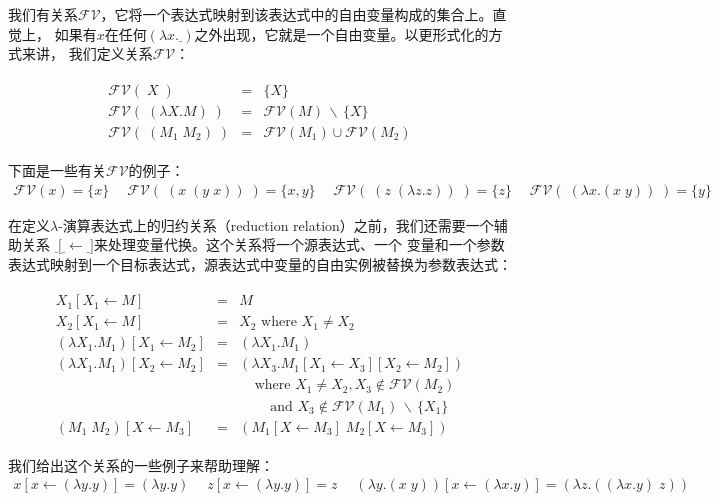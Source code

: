\documentclass[12pt]{article}
\begin{document}
\indent{}我们有关系$\mathcal{FV}$，它将一个表达式映射到该表达式中的自由变量构成的集合上。直觉上，
如果有$x$在任何$(\lambda x.\underline{~})$之外出现，它就是一个自由变量。以更形式化的方式来讲，
我们定义关系$\mathcal{FV}$：
\begin{tcolorbox}[top=-0.8em,left=0mm,right=0mm]
\begin{gather*}
\begin{array}{lcl}
\mathcal{FV}(\;X\;)             & = & \{X\}\\
\mathcal{FV}(\;(\lambda X.M)\;) & = & \mathcal{FV}(M) \,\backslash\, \{X\}\\
\mathcal{FV}(\;(M_1\;M_2)\;)    & = & \mathcal{FV}(M_1) \cup \mathcal{FV}(M_2)
\end{array}
\end{gather*}
\end{tcolorbox}
\noindent{}下面是一些有关$\mathcal{FV}$的例子：
\begin{gather*}
\mathcal{FV}(x) = \{x\} \quad\; \mathcal{FV}(\;(x\;(y\;x))\;) = \{x,y\}%
\quad\; \mathcal{FV}(\;(z\;(\lambda z.z))\;) = \{z\} \quad\; \mathcal{FV}(\;(\lambda x.(x\;y))\;) = \{y\}
\end{gather*}

\indent{}在定义$\lambda$-演算表达式上的归约关系（reduction relation）之前，我们还需要一个辅助关系
$\underline{~}\big[\underline{~} \leftarrow \underline{~}\big]$来处理变量代换。这个关系将一个源表达式、一个
变量和一个参数表达式映射到一个目标表达式，源表达式中变量的自由实例被替换为参数表达式：
\begin{tcolorbox}[top=-0.8em,left=0mm,right=0mm]
\begin{gather*}
\begin{array}{lcl}
X_1[X_1 \leftarrow M] & = & M\\
X_2[X_1 \leftarrow M] & = & X_2 \textrm{ where }X_1\neq X_2\\
(\lambda X_1.M_1)[X_1 \leftarrow M_2] & = & (\lambda X_1.M_1)\\
(\lambda X_1.M_1)[X_2 \leftarrow M_2] & = & (\lambda X_3.M_1[X_1 \leftarrow X_3][X_2 \leftarrow M_2])\\
                                      &   & \;\;\;\;\textrm{where }X_1 \neq X_2, X_3 \not\in \mathcal{FV}(M_2)\\
                                      &   & \;\;\;\;\;\;\;\;\textrm{and }X_3 \not\in \mathcal{FV}(M_1)\,\backslash\,\{X_1\}\\
(M_1 \; M_2)[X \leftarrow M_3]        & = & (M_1[X \leftarrow M_3]\; M_2[X \leftarrow M_3])
\end{array}
\end{gather*}
\end{tcolorbox}
\noindent{}我们给出这个关系的一些例子来帮助理解：
\begin{gather*}
x[x\leftarrow (\lambda y.y)] = (\lambda y.y) \quad\; z[x\leftarrow (\lambda y.y)] = z \quad\;%
(\lambda y.(x\;y))[x\leftarrow (\lambda x.y)] = (\lambda z.((\lambda x.y)\; z))
\end{gather*}
\end{document}

